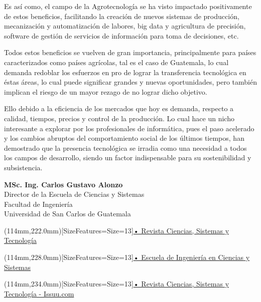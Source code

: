 \documentclass[12pt,spanish,Letterpaper,openany]{book}
\newcommand{\spacetwomilis}{\vspace{2mm}}
\begin{document}
Es así como, el campo de la Agrotecnología se ha visto impactado positivamente de estos beneficios, facilitando la creación de nuevos sistemas de producción, mecanización y automatización de labores, big data y agricultura de precisión, software de gestión de servicios de información para toma de decisiones, etc.

Todos estos beneficios se vuelven de gran importancia, principalmente para países caracterizados como países agrícolas, tal es el caso de Guatemala, lo cual demanda redoblar los esfuerzos en pro de lograr la transferencia tecnológica en éstas áreas, lo cual puede significar grandes y nuevas oportunidades, pero también implican el riesgo de un mayor rezago de no lograr dicho objetivo.

Ello debido a la eficiencia de los mercados que hoy es demanda, respecto a calidad, tiempos, precios y control de la producción. Lo cual hace un nicho interesante a explorar por los profesionales de informática, pues el paso acelerado y los cambios abruptos del comportamiento social de los últimos tiempos, han demostrado que la presencia tecnológica se irradia como una necesidad a todos los campos de desarrollo, siendo un factor indispensable para su sostenibilidad y subsistencia.

\spacetwomilis


\textbf{MSc. Ing. Carlos Gustavo Alonzo}\\
Director de la Escuela de Ciencias y Sistemas\\
Facultad de Ingeniería\\
Universidad de San Carlos de Guatemala


\begin{textblock*}{\textwidth}(114mm,222.0mm)[SizeFeatures={Size=13}]{\color{white}\href{http://c3.usac.edu.gt/revistasistemas/index.php}{• Revista Ciencias, Sistemas y Tecnología}}\end{textblock*}

\begin{textblock*}{\textwidth}(114mm,228.0mm)[SizeFeatures={Size=13}]{\color{white}\href{https://dtt-ecys.org/magazine/public_edicionRevista}{• Escuela de Ingeniería en Ciencias y Sistemas}}\end{textblock*}

\begin{textblock*}{\textwidth}(114mm,234.0mm)[SizeFeatures={Size=13}]{\color{white}\href{https://issuu.com/revistaecys}{• Revista Ciencias, Sistemas y Tecnología - Issuu.com}}\end{textblock*}
\end{document}
